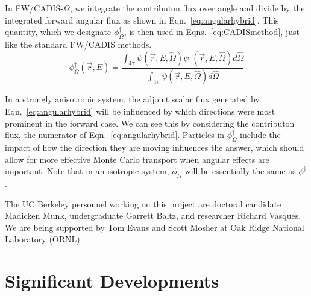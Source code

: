 \documentclass[12pt]{article}
\begin{document}
In FW/CADIS-$\Omega$, we integrate the contributon flux over angle and divide by the integrated forward angular flux as shown in Eqn.~\eqref{eq:angularhybrid}.
This quantity, which we designate $\phi^{\dagger}_{\Omega}$, is then used in Eqns.~\eqref{eq:CADISmethod}, just like the standard FW/CADIS methods.
%
\begin{equation} 
\phi^{\dagger}_{\Omega}(\vec{r},E) = \frac{\int_{4\pi} \psi(\vec {r} ,E,\hat{\Omega})\psi^{\dagger}(\vec {r} ,E,\hat{\Omega})d\hat\Omega }{\int_{4\pi}\psi(\vec {r} ,E,\hat{\Omega})d\hat\Omega}
\label{eq:angularhybrid}
\end{equation}

In a strongly anisotropic system, the adjoint scalar flux generated by Eqn.~\eqref{eq:angularhybrid} will be influenced by which directions were most prominent in the forward case. 
We can see this by considering the contributon flux, the numerator of Eqn.~\eqref{eq:angularhybrid}.
Particles in $\phi^{\dagger}_{\Omega}$ include the impact of how the direction they are moving influences the answer, 
which should allow for more effective Monte Carlo transport when angular effects are important. 
Note that in an isotropic system, $\phi^{\dagger}_{\Omega}$ will be essentially the same as $\phi^{\dagger}$. 

The UC Berkeley personnel working on this project are doctoral candidate Madicken Munk, undergraduate Garrett Baltz, and researcher Richard Vasques. We are being supported by Tom Evans and Scott Mosher at Oak Ridge National Laboratory (ORNL). 


\section{Significant Developments}
\label{sect::sig-devel}
\end{document}
